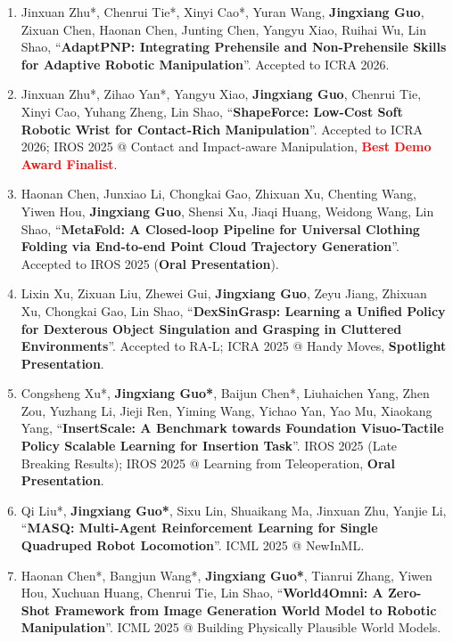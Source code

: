 \documentclass[letterpaper,11pt]{article}
\begin{document}
\begin{enumerate}
  \item Jinxuan Zhu*, Chenrui Tie*, Xinyi Cao*, Yuran Wang, \textbf{Jingxiang Guo}, Zixuan Chen, Haonan Chen, Junting Chen, Yangyu Xiao, Ruihai Wu, Lin Shao, ``\textbf{AdaptPNP: Integrating Prehensile and Non-Prehensile Skills for Adaptive Robotic Manipulation}''. Accepted to ICRA 2026.

  \item Jinxuan Zhu*, Zihao Yan*, Yangyu Xiao, \textbf{Jingxiang Guo}, Chenrui Tie, Xinyi Cao, Yuhang Zheng, Lin Shao, ``\textbf{ShapeForce: Low-Cost Soft Robotic Wrist for Contact-Rich Manipulation}''. Accepted to ICRA 2026; IROS 2025 @ Contact and Impact-aware Manipulation, \textcolor{red}{\textbf{Best Demo Award Finalist}}.

  \item Haonan Chen, Junxiao Li, Chongkai Gao, Zhixuan Xu, Chenting Wang, Yiwen Hou, \textbf{Jingxiang Guo}, Shensi Xu, Jiaqi Huang, Weidong Wang, Lin Shao, ``\textbf{MetaFold: A Closed-loop Pipeline for Universal Clothing Folding via End-to-end Point Cloud Trajectory Generation}''. Accepted to IROS 2025 (\textbf{Oral Presentation}).

  \item Lixin Xu, Zixuan Liu, Zhewei Gui, \textbf{Jingxiang Guo}, Zeyu Jiang, Zhixuan Xu, Chongkai Gao, Lin Shao, ``\textbf{DexSinGrasp: Learning a Unified Policy for Dexterous Object Singulation and Grasping in Cluttered Environments}''. Accepted to RA-L; ICRA 2025 @ Handy Moves, \textbf{Spotlight Presentation}.

  \item Congsheng Xu*, \textbf{Jingxiang Guo*}, Baijun Chen*, Liuhaichen Yang, Zhen Zou, Yuzhang Li, Jieji Ren, Yiming Wang, Yichao Yan, Yao Mu, Xiaokang Yang, ``\textbf{InsertScale: A Benchmark towards Foundation Visuo-Tactile Policy Scalable Learning for Insertion Task}''. IROS 2025 (Late Breaking Results); IROS 2025 @ Learning from Teleoperation, \textbf{Oral Presentation}.

  \item Qi Liu*, \textbf{Jingxiang Guo*}, Sixu Lin, Shuaikang Ma, Jinxuan Zhu, Yanjie Li, ``\textbf{MASQ: Multi-Agent Reinforcement Learning for Single Quadruped Robot Locomotion}''. ICML 2025 @ NewInML.

  \item Haonan Chen*, Bangjun Wang*, \textbf{Jingxiang Guo*}, Tianrui Zhang, Yiwen Hou, Xuchuan Huang, Chenrui Tie, Lin Shao, ``\textbf{World4Omni: A Zero-Shot Framework from Image Generation World Model to Robotic Manipulation}''. ICML 2025 @ Building Physically Plausible World Models.


\end{enumerate}
\end{document}
